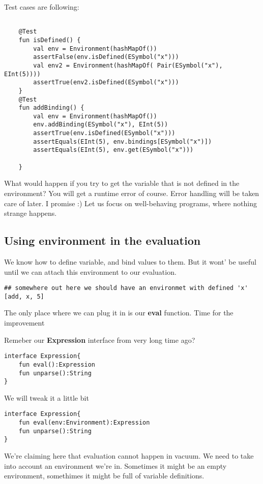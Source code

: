 \documentclass[11pt]{article}
\begin{document}
Test cases are following:

\begin{verbatim}

    @Test
    fun isDefined() {
        val env = Environment(hashMapOf())
        assertFalse(env.isDefined(ESymbol("x")))
        val env2 = Environment(hashMapOf( Pair(ESymbol("x"), EInt(5))))
        assertTrue(env2.isDefined(ESymbol("x")))
    }
    @Test
    fun addBinding() {
        val env = Environment(hashMapOf())
        env.addBinding(ESymbol("x"), EInt(5))
        assertTrue(env.isDefined(ESymbol("x")))
        assertEquals(EInt(5), env.bindings[ESymbol("x")])
        assertEquals(EInt(5), env.get(ESymbol("x")))

    }
\end{verbatim}

What would happen if you try to get the variable that is not defined in the environment?
You will get a runtime error of course. Error handling will be taken care of later. I promise :)
Let us focus on well-behaving programs, where nothing strange happens.

\subsection{Using environment in the evaluation}
\label{sec:orge801904}
We know how to define variable, and bind values to them.
But it wont' be useful until we can attach this environment to our evaluation.
\begin{verbatim}
## somewhere out here we should have an environmet with defined 'x'
[add, x, 5]
\end{verbatim}

The only place where we can plug it in is our \textbf{eval} function.
Time for the improvement

Remeber our \textbf{Expression} interface from very long time ago?
\begin{verbatim}
interface Expression{
    fun eval():Expression
    fun unparse():String
}
\end{verbatim}

We will tweak it a little bit

\begin{verbatim}
interface Expression{
    fun eval(env:Environment):Expression
    fun unparse():String
}
\end{verbatim}

We're claiming here that evaluation cannot happen in vacuum. We need to take into account an environment we're in.
Sometimes it might be an empty environment, somethimes it might be full of variable definitions.
\end{document}
